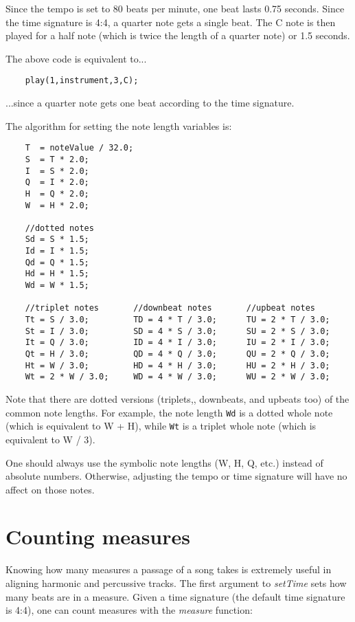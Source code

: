 \documentclass{article}
\begin{document}
Since the tempo is set to 80 beats per minute, one beat lasts
0.75 seconds. Since the time signature is 4:4, a quarter note
gets a single beat. The C note is then played for a half
note (which is twice the length of a quarter note) or
1.5 seconds.

The above code is equivalent to...

\begin{verbatim}
    play(1,instrument,3,C);
\end{verbatim}

...since a quarter note gets one beat according to the time signature.

The algorithm for setting the note length variables is:

\begin{verbatim}
    T  = noteValue / 32.0;
    S  = T * 2.0;
    I  = S * 2.0;
    Q  = I * 2.0;
    H  = Q * 2.0;
    W  = H * 2.0;

    //dotted notes
    Sd = S * 1.5;
    Id = I * 1.5;
    Qd = Q * 1.5;
    Hd = H * 1.5;
    Wd = W * 1.5;

    //triplet notes       //downbeat notes       //upbeat notes
    Tt = S / 3.0;         TD = 4 * T / 3.0;      TU = 2 * T / 3.0;
    St = I / 3.0;         SD = 4 * S / 3.0;      SU = 2 * S / 3.0;
    It = Q / 3.0;         ID = 4 * I / 3.0;      IU = 2 * I / 3.0;
    Qt = H / 3.0;         QD = 4 * Q / 3.0;      QU = 2 * Q / 3.0;
    Ht = W / 3.0;         HD = 4 * H / 3.0;      HU = 2 * H / 3.0;
    Wt = 2 * W / 3.0;     WD = 4 * W / 3.0;      WU = 2 * W / 3.0;
\end{verbatim}

Note that there are dotted versions 
(triplets,, downbeats, and upbeats too) of the common note lengths.
For example, the note length
{\tt Wd} is a dotted whole note (which is
equivalent to W + H),
while {\tt Wt} is a triplet
whole note (which is equivalent to W / 3).

One should always use the symbolic note lengths (W, H, Q, etc.)
instead of absolute numbers. Otherwise, adjusting the
tempo or time signature will have no affect on those
notes.

\section*{Counting measures}

Knowing how many measures a passage of a song
takes is extremely useful in aligning harmonic
and percussive tracks.
The first argument to {\it setTime} sets how
many beats are in a measure.
Given a time signature (the default time signature is 4:4),
one can count measures with the {\it measure} function:
\end{document}
